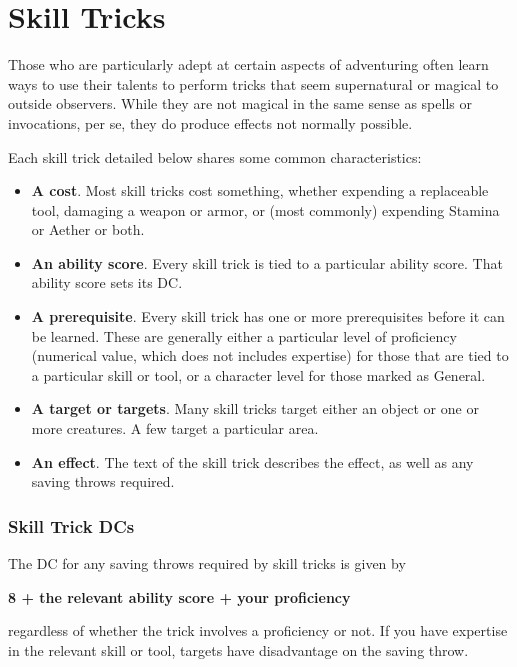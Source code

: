 \chapter{Skill Tricks}
\label{ch:skill-tricks}

Those who are particularly adept at certain aspects of adventuring often learn ways to use their talents to perform tricks that seem supernatural or magical to outside observers. While they are not magical in the same sense as spells or invocations, per se, they do produce effects not normally possible.

Each skill trick detailed below shares some common characteristics:
\begin{itemize}
	\item \textbf{A cost}. Most skill tricks cost something, whether expending a replaceable tool, damaging a weapon or armor, or (most commonly) expending Stamina or Aether or both.
	\item \textbf{An ability score}. Every skill trick is tied to a particular ability score. That ability score sets its DC.
	\item \textbf{A prerequisite}. Every skill trick has one or more prerequisites before it can be learned. These are generally either a particular level of proficiency (numerical value, which does not includes expertise) for those that are tied to a particular skill or tool, or a character level for those marked as General.
	\item \textbf{A target or targets}. Many skill tricks target either an object or one or more creatures. A few target a particular area.
	\item \textbf{An effect}. The text of the skill trick describes the effect, as well as any saving throws required.
\end{itemize}

\subsection{Skill Trick DCs}
The DC for any saving throws required by skill tricks is given by

\begin{center}
\textbf{8 + the relevant ability score + your proficiency}
\end{center}

regardless of whether the trick involves a proficiency or not. If you have expertise in the relevant skill or tool, targets have disadvantage on the saving throw.

